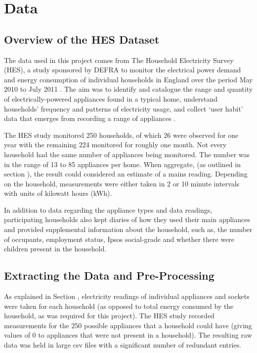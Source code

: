 \chapter{Data}


\section{Overview of the HES Dataset}
The data used in this project comes from The Household Electricity Survey (HES), a study sponsored by DEFRA to monitor the electrical power demand and energy consumption of individual households in England over the period May 2010 to July 2011 \cite{HES}. The aim was to identify and catalogue the range and quantity of electrically-powered appliances found in a typical home, understand households' frequency and patterns of electricity usage, and collect `user habit' data that emerges from recording a range of appliances \cite{early_findings}.

The HES study monitored 250 households, of which 26 were observed for one year with the remaining 224 monitored for roughly one month. Not every household had the same number of appliances being monitored. The number was in the range of 13 to 85 appliances per home. When aggregate, (as outlined in section \aggregationSection), the result could considered an estimate of a mains reading. Depending on the household, measurements were either taken in  2 or 10 minute intervals with units of kilowatt hours (kWh).

In addition to data regarding the appliance types and data readings, participating households also kept diaries of how they used their main appliances and provided supplemental information about the household, such as, the number of occupants, employment status, Ipsos social-grade and whether there were children present in the household.


\section{Extracting the Data and Pre-Processing}

As explained in Section \mentionOfAggregationSection, electricity readings of individual appliances and sockets were taken for each household (as opposed to total energy consumed by the household, as was required for this project). The HES study recorded measurements for the 250 possible appliances that a household could have (giving values of 0 to appliances that were not present in a household). The resulting raw data was held in large csv files with a significant number of redundant entries. 

